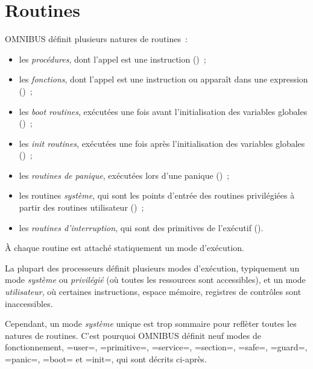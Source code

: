 




\chapter{Routines}

OMNIBUS définit plusieurs natures de routines~:
\begin{itemize}
  \item les \emph{procédures}, dont l'appel est une instruction ()~;
  \item les \emph{fonctions}, dont l'appel est une instruction ou apparaît dans une expression ()~;
  \item les \emph{boot routines}, exécutées une fois avant l'initialisation des variables globales ()~;
  \item les \emph{init routines}, exécutées une fois après l'initialisation des variables globales ()~;
  \item les \emph{routines de panique}, exécutées lors d'une panique ()~;
  \item les routines \emph{système}, qui sont les points d'entrée des routines privilégiées à partir des routines utilisateur ()~;
  \item les \emph{routines d'interruption}, qui sont des primitives de l'exécutif ().
\end{itemize}



À chaque routine est attaché statiquement un mode d'exécution.

La plupart des processeurs définit plusieurs modes d'exécution, typiquement un mode \emph{système} ou \emph{privilégié} (où toutes les ressources sont accessibles), et un mode \emph{utilisateur}, où certaines instructions, espace mémoire, registres de contrôles sont inaccessibles.

Cependant, un mode \emph{système} unique est trop sommaire pour reflèter toutes les natures de routines. C'est pourquoi OMNIBUS définit neuf modes de fonctionnement, \omnibus=user=, \omnibus=primitive=, \omnibus=service=, \omnibus=section=, \omnibus=safe=, \omnibus=guard=, \omnibus=panic=, \omnibus=boot= et \omnibus=init=, qui sont décrits ci-après.

